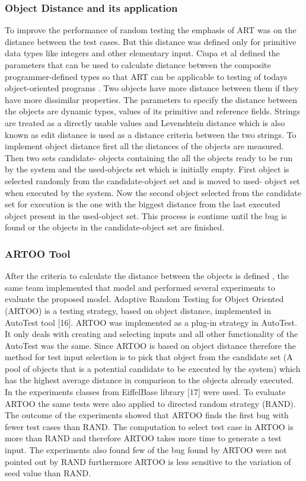 \subsubsection{Object Distance and its application}
To improve the performance of random testing the emphasis of ART was on the distance between the test cases. But this distance was defined only for primitive data types like integers and other elementary input. Ciupa et al defined the parameters that can be used to calculate distance between the composite programmer-defined types so that ART can be applicable to testing of todays object-oriented programs \cite{Ciupa2006}. Two objects have more distance between them if they have more dissimilar properties.
The parameters to specify the distance between the objects are dynamic types, values of its primitive and reference fields. Strings are treated as a directly usable values and Levenshtein distance \cite{Levenshtein1966} which is also known as edit distance is used as a distance criteria between the two strings.
To implement object distance first all the distances of the objects are measured. Then two sets candidate- objects containing the all the objects ready to be run by the system and the used-objects set which is initially empty. First object is selected randomly from the candidate-object set and is moved to used- object set when executed by the system. Now the second object selected from the candidate set for execution is the one with the biggest distance from the last executed object present in the used-object set. This process is continue until the bug is found or the objects in the candidate-object set are finished.

\subsubsection{ARTOO Tool}
After the criteria to calculate the distance between the objects is defined \cite{Ciupa2006}, the same team implemented that model and performed several experiments to evaluate the proposed model. Adaptive Random Testing for Object Oriented (ARTOO) is a testing strategy, based on object distance, implemented in AutoTest tool [16].
ARTOO was implemented as a plug-in strategy in AutoTest. It only deals with creating and selecting inputs and all other functionality of the AutoTest was the same. Since ARTOO is based on object distance therefore the method for test input selection is to pick that object from the candidate set (A pool of objects that is a potential candidate to be executed by the system) which has the highest average distance in comparison to the objects already executed.
In the experiments classes from EiffelBase library [17] were used. To evaluate ARTOO the same tests were also applied to directed random strategy (RAND). The outcome of the experiments showed that ARTOO finds the first bug with fewer test cases than RAND. The computation to select test case in ARTOO is more than RAND and therefore ARTOO takes more time to generate a test input. The experiments also found few of the bug found by ARTOO were not pointed out by RAND furthermore ARTOO is less sensitive to the variation of seed value than RAND.

